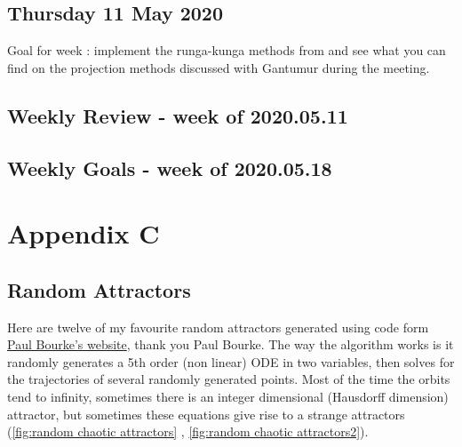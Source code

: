 \documentclass[12pt]{article}
\begin{document}
\subsection{Thursday 11 May 2020}
Goal for week : implement the runga-kunga methods from \cite{Duruisseaux} and see what you can find on the projection methods discussed with Gantumur during the meeting. 


\subsection{Weekly Review - week of 2020.05.11}

\subsection{Weekly Goals - week of 2020.05.18}

\section{Appendix C}\label{appendix c}
\subsection{Random Attractors}
Here are twelve of my favourite random attractors generated using code form \href{http://paulbourke.net/fractals/lyapunov/}{Paul Bourke's website}, thank you Paul Bourke. The way the algorithm works is it randomly generates a 5th order (non linear) ODE in two variables, then solves for the trajectories of several randomly generated points. Most of the time the orbits tend to infinity, sometimes there is an integer dimensional (Hausdorff dimension) attractor, but sometimes these equations give rise to a strange attractors (\ref{fig:random chaotic attractors} , \ref{fig:random chaotic attractors2}). 
\end{document}
